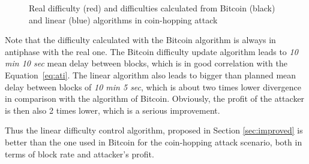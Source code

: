 \documentclass[]{llncs}
\newcommand{\attackname}{coin-hopping attack}
\begin{document}
\begin{figure}[h]
\caption{Real difficulty (red) and difficulties calculated from Bitcoin (black) and linear (blue) algorithms in \attackname{}}
\label{fig:attack}
\end{figure}

Note that the difficulty calculated with the Bitcoin algorithm is always in antiphase with the real one.
The Bitcoin difficulty update algorithm leads to {\em 10 min 10 sec} mean delay between blocks, which is in good correlation with the Equation~\ref{eq:ati}.
The linear algorithm also leads to bigger than planned mean delay between blocks of {\em 10 min 5 sec}, which is about two times lower divergence in comparison with the algorithm of Bitcoin. Obviously, the profit of the attacker is then also 2 times lower, which is a serious improvement.

Thus the linear difficulty control algorithm, proposed in Section \ref{sec:improved} is better than the one used in Bitcoin for the \attackname{} scenario, both in terms of block rate and attacker's profit.



\end{document}
